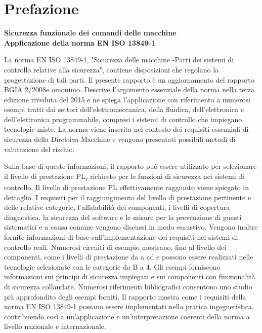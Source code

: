 \chapter{Prefazione}
\label{cap:prefazione}

\textbf{Sicurezza funzionale dei comandi delle macchine}\\
\textbf{Applicazione della norma EN ISO 13849-1}

La norma EN ISO 13849-1, "Sicurezza delle macchine -Parti dei sistemi di controllo relative alla sicurezza", contiene disposizioni che regolano la progettazione di tali parti. Il presente rapporto è un aggiornamento del rapporto BGIA 2/2008e omonimo. Descrive l'argomento essenziale della norma nella terza edizione riveduta del 2015 e ne spiega l'applicazione con riferimento a numerosi esempi tratti dai settori dell'elettromeccanica, della fluidica, dell'elettronica e dell'elettronica programmabile, compresi i sistemi di controllo che impiegano tecnologie miste. La norma viene inserita nel contesto dei requisiti essenziali di sicurezza della Direttiva Macchine e vengono presentati possibili metodi di valutazione del rischio.

Sulla base di queste informazioni, il rapporto può essere utilizzato per selezionare il livello di prestazione PL\textsubscript{\small r} richiesto per le funzioni di sicurezza nei sistemi di controllo. Il livello di prestazione PL effettivamente raggiunto viene spiegato in dettaglio. I requisiti per il raggiungimento del livello di prestazione pertinente e delle relative categorie, l'affidabilità dei componenti, i livelli di copertura diagnostica, la sicurezza del software e le misure per la prevenzione di guasti sistematici e a causa comune vengono discussi in modo esaustivo. Vengono inoltre fornite informazioni di base sull'implementazione dei requisiti nei sistemi di controllo reali. Numerosi circuiti di esempio mostrano, fino al livello dei componenti, come i livelli di prestazione da a ad e possono essere realizzati nelle tecnologie selezionate con le categorie da B a 4. Gli esempi forniscono informazioni sui principi di sicurezza impiegati e sui componenti con funzionalità di sicurezza collaudate. Numerosi riferimenti bibliografici consentono uno studio più approfondito degli esempi forniti. Il rapporto mostra come i requisiti della norma EN ISO 13849-1 possano essere implementati nella pratica ingegneristica, contribuendo così a un'applicazione e un'interpretazione coerenti della norma a livello nazionale e internazionale.
